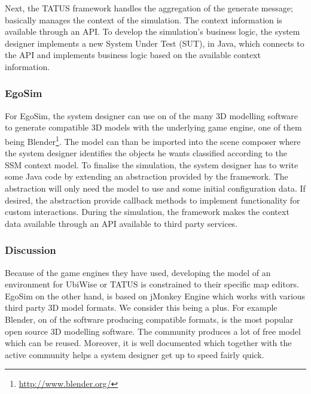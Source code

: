 Next, the TATUS framework handles the aggregation of the generate message; basically manages the context of the simulation. The context information is available through an API. To develop the simulation's business logic, the system designer implements a new System Under Test (SUT), in Java, which connects to the API and implements business logic based on the available context information.\\

\subsubsection{EgoSim} %
For EgoSim, the system designer can use on of the many 3D modelling software to generate compatible 3D models with the underlying game engine, one of them being Blender\footnote{\url{http://www.blender.org/}}. The model can than be imported into the scene composer where the system designer identifies the objects he wants classified according to the SSM context model. To finalise the simulation, the system designer has to write some Java code by extending an abstraction provided by the framework. The abstraction will only need the model to use and some initial configuration data. If desired, the abstraction provide callback methods to implement functionality for custom interactions. During the simulation, the framework makes the context data available through an API available to third party services.\\

\subsubsection{Discussion} %
Because of the game engines they have used, developing the model of an environment for UbiWise or TATUS is constrained to their specific map editors. EgoSim on the other hand, is based on jMonkey Engine which works with various third party 3D model formats. We consider this being a plus. For example Blender, on of the software producing compatible formats, is the most popular open source 3D modelling software. The community produces a lot of free model which can be reused. Moreover, it is well documented which together with the active community helps a system designer get up to speed fairly quick.\\

